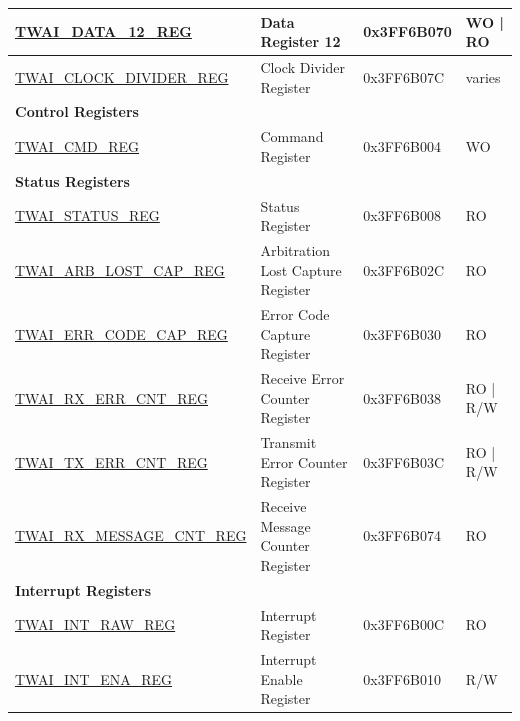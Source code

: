 \begin{longtable}{ | p{6cm} | p{5cm} | p{2.2cm} | p{2cm} | }
\hyperref[regdesc:TWAIDATA12REG]{TWAI\_DATA\_12\_REG} & Data Register 12 & 0x3FF6B070 & WO | RO \\ \hline
\hyperref[regdesc:TWAICLOCKDIVIDERREG]{TWAI\_CLOCK\_DIVIDER\_REG} & Clock Divider Register & 0x3FF6B07C & varies \\ \hline
\multicolumn{4}{|l|}{\textbf{Control Registers}} \\ \hline
\hyperref[regdesc:TWAICMDREG]{TWAI\_CMD\_REG} & Command Register & 0x3FF6B004 & WO \\ \hline
\multicolumn{4}{|l|}{\textbf{Status Registers}} \\ \hline
\hyperref[regdesc:TWAISTATUSREG]{TWAI\_STATUS\_REG} & Status Register & 0x3FF6B008 & RO \\ \hline
\hyperref[regdesc:TWAIARB LOST CAPREG]{TWAI\_ARB\_LOST\_CAP\_REG} & Arbitration Lost Capture Register & 0x3FF6B02C & RO \\ \hline
\hyperref[regdesc:TWAIERRCODECAPREG]{TWAI\_ERR\_CODE\_CAP\_REG} & Error Code Capture Register & 0x3FF6B030 & RO \\ \hline
\hyperref[regdesc:TWAIRXERRCNTREG]{TWAI\_RX\_ERR\_CNT\_REG} & Receive Error Counter Register & 0x3FF6B038 & RO | R/W \\ \hline
\hyperref[regdesc:TWAITXERRCNTREG]{TWAI\_TX\_ERR\_CNT\_REG} & Transmit Error Counter Register & 0x3FF6B03C & RO | R/W \\ \hline
\hyperref[regdesc:TWAIRXMESSAGECNTREG]{TWAI\_RX\_MESSAGE\_CNT\_REG} & Receive Message Counter Register & 0x3FF6B074 & RO \\ \hline
\multicolumn{4}{|l|}{\textbf{Interrupt Registers}} \\ \hline
\hyperref[regdesc:TWAIINTRAWREG]{TWAI\_INT\_RAW\_REG} & Interrupt Register & 0x3FF6B00C & RO \\ \hline
\hyperref[regdesc:TWAIINT ENAREG]{TWAI\_INT\_ENA\_REG} & Interrupt Enable Register & 0x3FF6B010 & R/W \\ \hline
\end{longtable}
